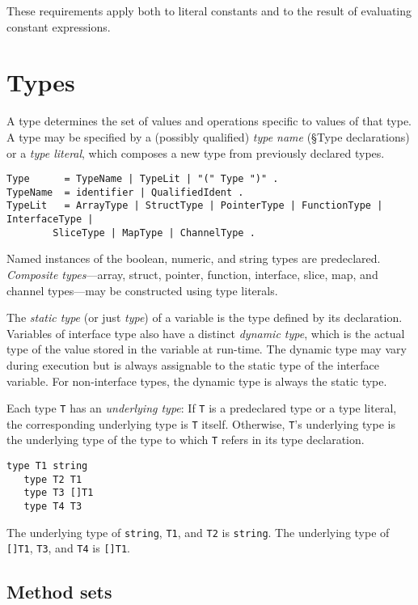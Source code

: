 These requirements apply both to literal constants and to the result of
evaluating constant expressions.

\section*{Types}

A type determines the set of values and operations specific to
values of that type. A type may be specified by a (possibly qualified)
\emph{type name} (§Type declarations) or a \emph{type literal},
which composes a new type from previously declared types.

\begin{Verbatim}[frame=single]
Type      = TypeName | TypeLit | "(" Type ")" .
TypeName  = identifier | QualifiedIdent .
TypeLit   = ArrayType | StructType | PointerType | FunctionType | InterfaceType |
        SliceType | MapType | ChannelType .
\end{Verbatim}

Named instances of the boolean, numeric, and string types are
predeclared. \emph{Composite
types}---array, struct, pointer, function, interface, slice, map, and
channel types---may be constructed using type literals.

The \emph{static type} (or just \emph{type}) of a variable is the type
defined by its declaration. Variables of interface type also have a
distinct \emph{dynamic type}, which is the actual type of the value
stored in the variable at run-time. The dynamic type may vary during
execution but is always assignable to the
static type of the interface variable. For non-interface types, the
dynamic type is always the static type.

Each type \texttt{T} has an \emph{underlying type}: If \texttt{T} is a
predeclared type or a type literal, the corresponding underlying type is
\texttt{T} itself. Otherwise, \texttt{T}'s underlying type is the
underlying type of the type to which \texttt{T} refers in its
type declaration.

\begin{Verbatim}[frame=single]
   type T1 string
   type T2 T1
   type T3 []T1
   type T4 T3
\end{Verbatim}

The underlying type of \texttt{string}, \texttt{T1}, and \texttt{T2} is
\texttt{string}. The underlying type of \texttt{{[}{]}T1}, \texttt{T3},
and \texttt{T4} is \texttt{{[}{]}T1}.

\subsection*{Method sets}

